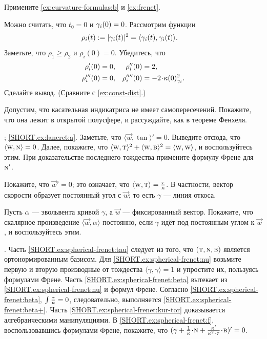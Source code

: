 \begin{multicols}{2}
Примените \ref{ex:curvature-formulas:b} и \ref{ex:frenet}.

Можно считать, что $t_0=0$ и $\gamma_i(0)\z=0$.
Рассмотрим функции
\begin{align*}
\rho_i(t)&\mathrel{:=}|\gamma_i(t)|^2=\langle \gamma_i(t),\gamma_i(t)\rangle.
\end{align*}
Заметьте, что $\rho_1\ge \rho_2$ и $\rho_i(0)=0$.
Убедитесь, что 
\begin{align*}
\rho_i'(0)&=0,
&
\rho_i''(0)&=2,
\\
\rho_i'''(0)&=0,
&
\rho_i''''(0)&=-2\cdot\kur(0)^2_{\gamma_i}.
\end{align*}
Сделайте вывод. (Сравните с \ref{ex:const-dist}.)

Допустим, что касательная индикатриса не имеет самопересечений.
Покажите, что она лежит в открытой полусфере, и рассуждайте, как в теореме Фенхеля.

\parbf{\ref{ex:lancret}}; \ref{SHORT.ex:lancret:a}.
Заметьте, что 
$\langle \vec w,\tan\rangle'=0$.
Выведите отсюда, что $\langle \text{\sc{w}}, \text{\sc{n}}\rangle =0$.
Далее, покажите, что $\langle \text{\sc{w}}, \text{\sc{t}}\rangle^2+\langle \text{\sc{w}}, \text{\sc{b}}\rangle^2=\langle \text{\sc{w}}, \text{\sc{w}}\rangle$, и воспользуйтесь этим.
При доказательстве последнего тождества примените формулу Френе для~$\text{\sc{n}}'$.

Покажите, что $\vec w'=0$;
это означает, что $\langle \vec w,\tan\rangle\z=\tfrac\tor\kur$.
В частности, вектор скорости образует постоянный угол с $\vec w$; то есть $\gamma$ --- линия откоса.

Пусть $\alpha$ --- эвольвента кривой $\gamma$, а $\vec w$ --- фиксированный вектор.
Покажите, что скалярное произведение $\langle \vec w,\alpha\rangle$ постоянно, если $\gamma$ идёт под постоянным углом к $\vec w$, и воспользуйтесь этим.

\parbf{\ref{ex:spherical-frenet}}.
Часть \ref{SHORT.ex:spherical-frenet:tau} следует из того, что $(\text{\sc{t}},\text{\sc{n}},\text{\sc{b}})$ является ортонормированным базисом.
Для \ref{SHORT.ex:spherical-frenet:nu} возьмите первую и вторую производные от тождества $\langle\gamma,\gamma\rangle=1$ и упростите их, пользуясь формулами Френе.
Часть \ref{SHORT.ex:spherical-frenet:beta} вытекает из \ref{SHORT.ex:spherical-frenet:nu} и формул Френе.
Согласно \ref{SHORT.ex:spherical-frenet:beta}, $\int\tfrac{\tau}{\kappa}=0$, следовательно, выполняется \ref{SHORT.ex:spherical-frenet:beta+}.
Часть \ref{SHORT.ex:spherical-frenet:kur-tor} доказывается алгебраическими манипуляциями.
В \ref{SHORT.ex:spherical-frenet:f},
воспользовавшись формулами Френе, покажите, что $(\gamma+\tfrac1\kur\cdot \norm+\tfrac{\kur'}{\kur^2\cdot\tor}\cdot\bi)'=0$.


\end{multicols}
